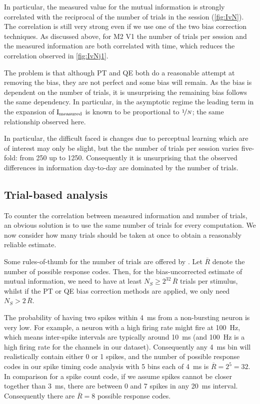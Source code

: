 In particular, the measured value for the mutual information is strongly correlated with the reciprocal of the number of trials in the session (\autoref{fig:IvN}).
The correlation is still very strong even if we use one of the two bias correction techniques.
As discussed above, for \ac{M2} \ac{V1} the number of trials per session and the measured information  are both correlated with time, which reduces the correlation observed in \autoref{fig:IvNj1}.

The problem is that although \ac{PT} and \ac{QE} both do a reasonable attempt at removing the bias, they are not perfect and some bias will remain.
As the bias is dependent on the number of trials, it is unsurprising the remaining bias follows the same dependency.
In particular, in the asymptotic regime the leading term in the expansion of $\operatorname{I}_{\text{measured}}$ is known to be proportional \citep{Treves1995} to $\nicefrac{1}{N}$; the same relationship observed here.

In particular, the difficult faced is changes due to perceptual learning which are of interest may only be slight, but the the number of trials per session varies five-fold: from 250 up to 1250.
Consequently it is unsurprising that the observed differences in information day-to-day are dominated by the number of trials.

\subsection{Trial-based analysis}

To counter the correlation between measured information and number of trials, an obvious solution is to use the same number of trials for every computation.
We now consider how many trials should be taken at once to obtain a reasonably reliable estimate.

Some rules-of-thumb for the number of trials are offered by \citep{Panzeri2007}.
Let $\overline{R}$ denote the number of possible response codes.
Then, for the bias-uncorrected estimate of mutual information, we need to have at least $N_S \ge 2^{32} \, \overline{R}$ trials per stimulus,
whilst if the \ac{PT} or \ac{QE} bias correction methods are applied, we only need $N_S > 2 \, \overline{R}$.

The probability of having two spikes within \SI{4}{ms} from a non-bursting neuron is very low.
For example, a neuron with a high firing rate might fire at \SI{100}{Hz}, which means inter-spike intervals are typically around \SI{10}{ms} (and \SI{100}{Hz} is a high firing rate for the channels in our dataset).
Consequently any \SI{4}{ms} bin will realistically contain either 0 or 1 spikes, and the number of possible response codes in our spike timing code analysis with 5 bins each of \SI{4}{ms} is $\overline{R} = 2^5 = 32$.
In comparison for a spike count code, if we assume spikes cannot be closer together than \SI{3}{ms}, there are between 0 and 7 spikes in any \SI{20}{ms} interval.
Consequently there are $\overline{R} = 8$ possible response codes.

